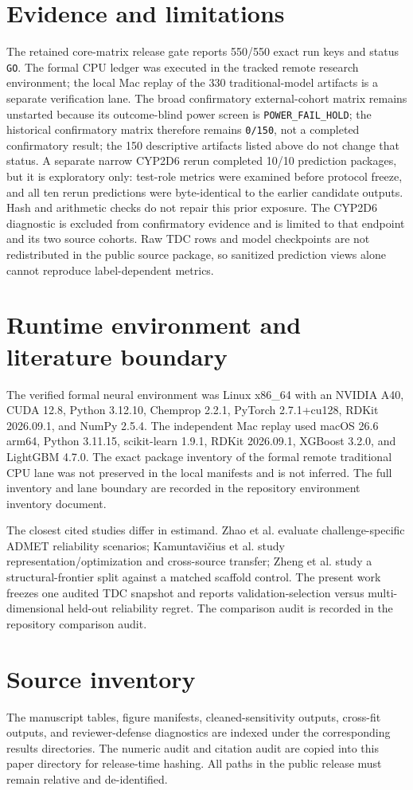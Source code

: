 \documentclass[11pt]{article}
\begin{document}
\section{Evidence and limitations}
The retained core-matrix release gate reports 550/550 exact run keys and status
\texttt{GO}. The formal CPU ledger was executed in the tracked remote research
environment; the local Mac replay of the 330 traditional-model artifacts is a
separate verification lane. The broad confirmatory external-cohort matrix
remains unstarted because its outcome-blind power screen is
\texttt{POWER\_FAIL\_HOLD}; the historical confirmatory matrix therefore remains
\texttt{0/150}, not a completed confirmatory result; the 150 descriptive
artifacts listed above do not change that status. A separate narrow CYP2D6
rerun completed 10/10 prediction packages, but it is exploratory only:
test-role metrics were examined before protocol freeze, and all ten rerun
predictions were byte-identical to the earlier candidate outputs. Hash and
arithmetic checks do not repair this prior exposure. The CYP2D6 diagnostic is
excluded from confirmatory evidence and is limited to that endpoint and its two
source cohorts. Raw TDC
rows and model checkpoints are not redistributed in the
public source package, so sanitized prediction views alone cannot reproduce
label-dependent metrics.

\section{Runtime environment and literature boundary}
The verified formal neural environment was Linux x86\_64 with an NVIDIA A40,
CUDA 12.8, Python 3.12.10, Chemprop 2.2.1, PyTorch 2.7.1+cu128, RDKit
2026.09.1, and NumPy 2.5.4. The independent Mac replay used macOS 26.6 arm64,
Python 3.11.15, scikit-learn 1.9.1, RDKit 2026.09.1, XGBoost 3.2.0, and
LightGBM 4.7.0. The exact package inventory of the formal remote traditional
CPU lane was not preserved in the local manifests and is not inferred. The
full inventory and lane boundary are recorded in
the repository environment inventory document.

The closest cited studies differ in estimand. Zhao et al. evaluate
challenge-specific ADMET reliability scenarios; Kamuntavičius et al. study
representation/optimization and cross-source transfer; Zheng et al. study a
structural-frontier split against a matched scaffold control. The present work
freezes one audited TDC snapshot and reports validation-selection versus
multi-dimensional held-out reliability regret. The comparison audit is
recorded in the repository comparison audit.

\section{Source inventory}
The manuscript tables, figure manifests, cleaned-sensitivity outputs, cross-fit
outputs, and reviewer-defense diagnostics are indexed under the corresponding
results directories. The numeric audit and citation audit
are copied into this paper directory for release-time hashing. All paths in the
public release must remain relative and de-identified.
\end{document}
